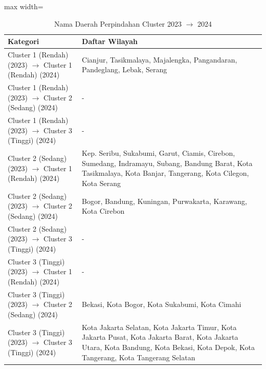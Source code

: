 \begin{table}[H]
\centering
\caption{Nama Daerah Perpindahan Cluster 2023 \(\rightarrow\) 2024} \makeatletter{}\makeatother
\begin{adjustbox}{max width=\textwidth}
\begin{tabular}{|p{4cm}|p{10cm}|}
\hline
\textbf{Kategori} & \textbf{Daftar Wilayah} \\
\hline
Cluster 1 (Rendah) (2023) \(\rightarrow\) Cluster 1 (Rendah) (2024) & Cianjur, Tasikmalaya, Majalengka, Pangandaran, Pandeglang, Lebak, Serang \\
\hline
Cluster 1 (Rendah) (2023) \(\rightarrow\) Cluster 2 (Sedang) (2024) & - \\
\hline
Cluster 1 (Rendah) (2023) \(\rightarrow\) Cluster 3 (Tinggi) (2024) & - \\
\hline
Cluster 2 (Sedang) (2023) \(\rightarrow\) Cluster 1 (Rendah) (2024) & Kep. Seribu, Sukabumi, Garut, Ciamis, Cirebon, Sumedang, Indramayu, Subang, Bandung Barat, Kota Tasikmalaya, Kota Banjar, Tangerang, Kota Cilegon, Kota Serang \\
\hline
Cluster 2 (Sedang) (2023) \(\rightarrow\) Cluster 2 (Sedang) (2024) & Bogor, Bandung, Kuningan, Purwakarta, Karawang, Kota Cirebon \\
\hline
Cluster 2 (Sedang) (2023) \(\rightarrow\) Cluster 3 (Tinggi) (2024) & - \\
\hline
Cluster 3 (Tinggi) (2023) \(\rightarrow\) Cluster 1 (Rendah) (2024) & - \\
\hline
Cluster 3 (Tinggi) (2023) \(\rightarrow\) Cluster 2 (Sedang) (2024) & Bekasi, Kota Bogor, Kota Sukabumi, Kota Cimahi \\
\hline
Cluster 3 (Tinggi) (2023) \(\rightarrow\) Cluster 3 (Tinggi) (2024) & Kota Jakarta Selatan, Kota Jakarta Timur, Kota Jakarta Pusat, Kota Jakarta Barat, Kota Jakarta Utara, Kota Bandung, Kota Bekasi, Kota Depok, Kota Tangerang, Kota Tangerang Selatan \\
\hline
\end{tabular}
\end{adjustbox}
\end{table}